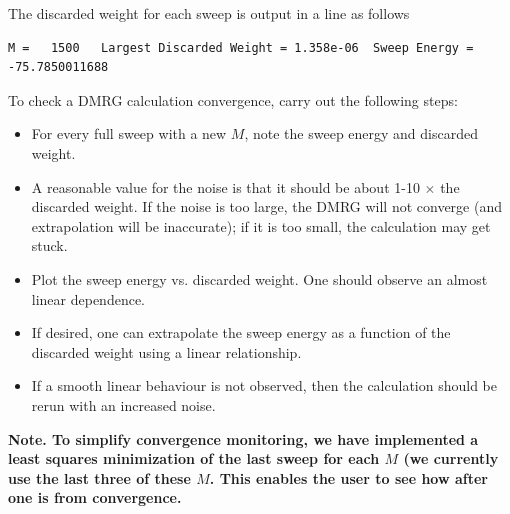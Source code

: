 \documentclass[letterpaper,12pt,aps, pra]{revtex4-1}
\begin{document}
The discarded weight for each sweep is output in a line as follows
\begin{verbatim}
M =   1500   Largest Discarded Weight = 1.358e-06  Sweep Energy =     -75.7850011688
\end{verbatim}

To check a DMRG calculation convergence, carry out the following steps:
\begin{itemize}
\item For every full sweep with a new $M$, note the sweep energy and discarded weight.
\item A reasonable value for the noise is that it should be about 1-10 $\times$ the discarded weight. If the noise
is too large, the DMRG will not converge (and extrapolation will be inaccurate); if it is too small, the calculation
may get stuck.
\item Plot the sweep energy vs. discarded weight. One should observe an almost linear dependence. 
\item If desired, one can extrapolate the sweep energy as a function of the discarded weight using a 
linear relationship. 
\item If a smooth linear behaviour is not observed, then the calculation should be rerun with an increased noise.
\end{itemize}

{\bf Note.  To simplify convergence monitoring, we have implemented a least
squares minimization of the last sweep for each $M$ (we currently use the last
three of these $M$. This enables the user to see how after one is from
convergence.}
\end{document}
